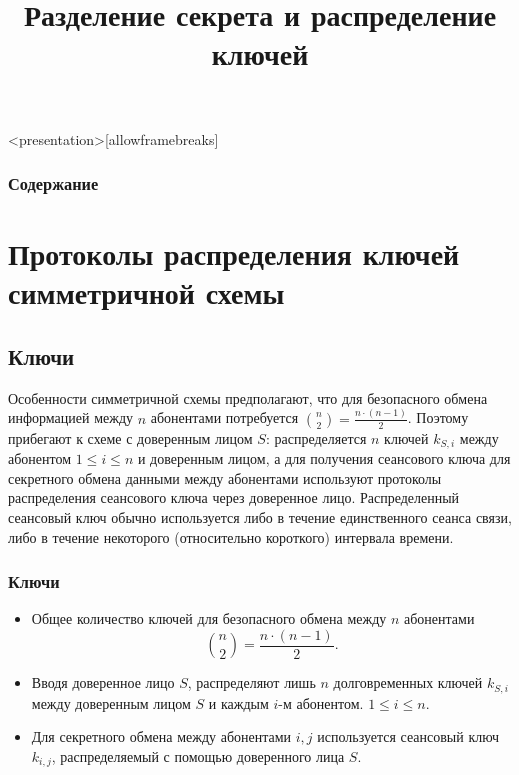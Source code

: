 
\title[Разделение секрета]{Разделение секрета и распределение ключей}

\newcommand{\Alice}{\textit{Алиса}}
\newcommand{\Bob}{\textit{Боб}}
\newcommand{\Clark}{\textit{Кларк}}





\begin{frame}<presentation>[allowframebreaks]
    \frametitle{Содержание}
    \tableofcontents
\end{frame}


\section{Протоколы распределения ключей симметричной схемы}


\subsection{Ключи}


Особенности симметричной схемы предполагают, что для безопасного обмена информацией между $n$ абонентами потребуется $\binom{n}{2}=\frac{n\cdot (n-1)}{2}$. Поэтому прибегают к схеме с доверенным лицом $S$: распределяется $n$ ключей $k_{S,i}$ между абонентом $1\leq i\leq n$ и доверенным лицом, а для получения \alert{сеансового} ключа для секретного обмена данными между абонентами используют протоколы распределения сеансового ключа через доверенное лицо. Распределенный сеансовый ключ обычно используется либо в течение единственного сеанса связи, либо в течение некоторого (относительно короткого) интервала времени.


\begin{frame}
    \frametitle{Ключи}
    
    \begin{itemize}
        \item Общее количество ключей для безопасного обмена между $n$ абонентами
        \[\binom{n}{2}=\frac{n\cdot (n-1)}{2}.\]
        \item Вводя доверенное лицо $S$, распределяют лишь $n$ \alert{долговременных} ключей $k_{S,i}$ между доверенным лицом $S$ и каждым $i$-м абонентом. $1\leq i\leq n.$
        \item Для секретного обмена между абонентами $i,j$ используется \alert{сеансовый} ключ $k_{i,j}$, распределяемый с помощью доверенного лица $S$.
    \end{itemize} 
\end{frame}



